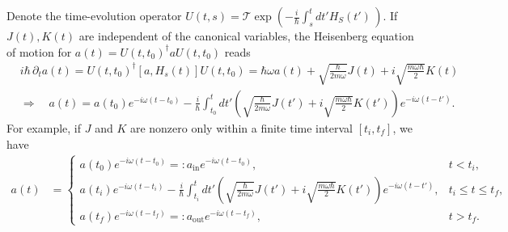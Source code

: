 \documentclass[../QFT_main.tex]{subfiles}
\begin{document}
\begin{mytheorem}
Denote the time-evolution operator $U(t,s)=\mathcal{T}\exp\left(-\tfrac{i}{\hbar}\int_s^t\!\!dt'H_S(t')\,\right)$.
If $J(t),K(t)$ are independent of the canonical variables, the Heisenberg equation of motion for $a(t)=U(t,t_0)^\dagger aU(t,t_0)$ reads
\begin{align}\label{eq:1d_oscillator_ladder_operator_time_evolution}
    &i\hbar\,\partial_t a(t)= U(t,t_0)^\dagger [a, H_s(t)] U(t,t_0)= \hbar \omega a(t) + \sqrt{\frac{\hbar}{2 m \omega}} J(t) + i \sqrt{\frac{m \omega \hbar}{2}} K(t)\\
    &\Longrightarrow \quad a(t) = a(t_0) e^{-i\omega (t-t_0)} - \frac{i}{\hbar} \int_{t_0}^t dt' \left(\sqrt{\tfrac{\hbar}{2 m \omega}} J(t') + i \sqrt{\tfrac{m \omega \hbar}{2}} K(t')\right) e^{-i\omega (t-t')}.
\end{align}
For example, if $J$ and $K$ are nonzero only within a finite time interval $[t_i, t_f]$, we have
\begin{align}\label{eq:a_in_a_out_1d_oscillator}
    a(t) &= \begin{cases}
        a(t_0) e^{-i\omega (t-t_0)}=: a_{\mathrm{in}}e^{-i\omega (t-t_0)}, & t < t_i,\\[6pt]
        a(t_i) e^{-i\omega (t-t_i)} - \frac{i}{\hbar} \int_{t_i}^t dt' \left(\sqrt{\tfrac{\hbar}{2 m \omega}} J(t') + i \sqrt{\tfrac{m \omega \hbar}{2}} K(t')\right) e^{-i\omega (t-t')}, & t_i \leq t \leq t_f,\\[6pt]
        a(t_f) e^{-i\omega (t-t_f)}=: a_{\mathrm{out}} e^{-i\omega (t-t_f)}, & t > t_f.
    \end{cases}
\end{align}
\end{mytheorem}
\end{document}
